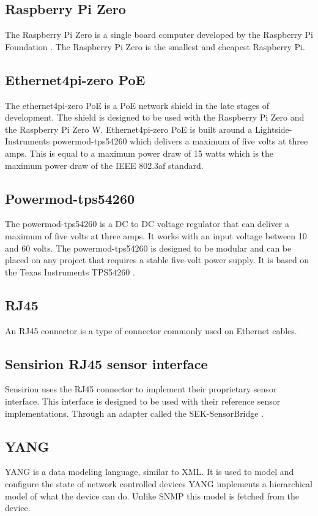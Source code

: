 \documentclass[12pt]{article}
\begin{document}
\subsection{Raspberry Pi Zero}
The Raspberry Pi Zero is a single board computer developed by the Raspberry Pi Foundation \cite{foundationTeachLearnMake2025}. 
The Raspberry Pi Zero is the smallest and cheapest Raspberry Pi.

\subsection{Ethernet4pi-zero PoE}
The ethernet4pi-zero PoE is a PoE network shield in the late stages of development.
The shield is designed to be used with the Raspberry Pi Zero and the Raspberry Pi Zero W.
Ethernet4pi-zero PoE is built around a Lightside-Instruments powermod-tps54260 which delivers a maximum of five volts at three amps.
This is equal to a maximum power draw of 15 watts which is the maximum power draw of the IEEE 802.3af standard.

\subsection{Powermod-tps54260}
The powermod-tps54260 is a DC to DC voltage regulator that can deliver a maximum of five volts at three amps.
It works with an input voltage between 10 and 60 volts. The powermod-tps54260 is designed to be modular and
can be placed on any project that requires a stable five-volt power supply. It is based on the Texas Instruments TPS54260 \cite{TPS54260DataSheet}.


\subsection{RJ45}
An RJ45 connector is a type of connector commonly used on Ethernet cables.

\subsection{Sensirion RJ45 sensor interface}
Sensirion uses the RJ45 connector to implement their proprietary sensor interface.
This interface is designed to be used with their reference sensor implementations. Through 
an adapter called the SEK-SensorBridge \cite{agSEKSensorBridgeConnectingBridgeTwo}.

\subsection{YANG}
YANG is a data modeling language, similar to XML. It is used to model and configure the state of network controlled devices \cite{bjorklundYANG11Data2016}
YANG implements a hierarchical model of what the device can do. Unlike SNMP this model is fetched from the device.
\end{document}
